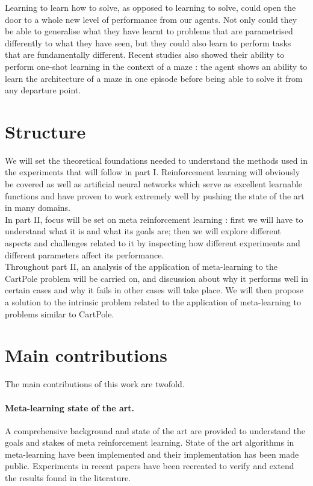 Learning to learn how to solve, as opposed to learning to solve, could open the door to a
whole new level of performance from our agents. Not only could they 
be able to generalise what they have learnt to problems that are parametrised
differently to what they have seen, but they could also learn to perform
tasks that are fundamentally different. Recent studies \cite{learningtorl,
fastrlviaslowrl} also showed their ability to perform one-shot learning in
the context of a maze : the agent shows an ability to learn the architecture
of a maze in one episode before being able to solve it from any departure point.


\section{Structure}
We will set the theoretical foundations needed to understand the methods used
in the experiments that will follow in part I. Reinforcement learning will
obviously be covered as well as artificial neural networks which serve as 
excellent learnable functions and have proven to work extremely well by
pushing the state of the art in many domains.\\

In part II, focus will be set on meta reinforcement learning : first we will
have to understand what it is and what its goals are; then we will explore different
aspects and challenges related to it by inspecting how different experiments
and different parameters affect its performance.\\

Throughout part II, an analysis of the application of meta-learning to the
CartPole problem will be carried on, and discussion about why it performs
well in certain cases and why it fails in other cases will take place. We will
then propose a solution to the intrinsic problem related to the application
of meta-learning to problems similar to CartPole.


\section{Main contributions}
The main contributions of this work are twofold.

\paragraph{Meta-learning state of the art.}
A comprehensive background and state of the art are
provided to understand the goals and stakes of meta reinforcement learning.
State of the art algorithms in meta-learning have been implemented and their
implementation has been made public. Experiments in recent papers have been
recreated to verify and extend the results found in the literature.

